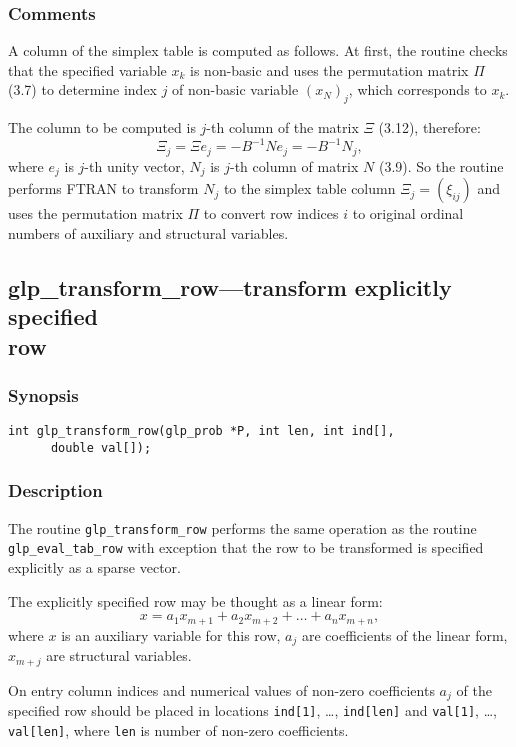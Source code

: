 \subsubsection*{Comments}

A column of the simplex table is computed as follows. At first, the
routine checks that the specified variable $x_k$ is non-basic and uses
the permutation matrix $\Pi$ (3.7) to determine index $j$ of non-basic
variable $(x_N)_j$, which corresponds to $x_k$.

The column to be computed is $j$-th column of the matrix $\Xi$ (3.12),
therefore:
$$\Xi_j=\Xi e_j=-B^{-1}Ne_j=-B^{-1}N_j,$$
where $e_j$ is $j$-th unity vector, $N_j$ is $j$-th column of matrix
$N$ (3.9). So the routine performs FTRAN to transform $N_j$ to the
simplex table column $\Xi_j=(\xi_{ij})$ and uses the permutation matrix
$\Pi$ to convert row indices $i$ to original ordinal numbers of
auxiliary and structural variables.

\newpage

\subsection{glp\_transform\_row---transform explicitly specified\\
row}

\subsubsection*{Synopsis}

\begin{verbatim}
int glp_transform_row(glp_prob *P, int len, int ind[],
      double val[]);
\end{verbatim}

\subsubsection*{Description}

The routine \verb|glp_transform_row| performs the same operation as the
routine \verb|glp_eval_tab_row| with exception that the row to be
transformed is specified explicitly as a sparse vector.

The explicitly specified row may be thought as a linear form:
$$x=a_1x_{m+1}+a_2x_{m+2}+\dots+a_nx_{m+n},$$
where $x$ is an auxiliary variable for this row, $a_j$ are coefficients
of the linear form, $x_{m+j}$ are structural variables.

On entry column indices and numerical values of non-zero coefficients
$a_j$ of the specified row should be placed in locations \verb|ind[1]|,
\dots, \verb|ind[len]| and \verb|val[1]|, \dots, \verb|val[len]|, where
\verb|len| is number of non-zero coefficients.

